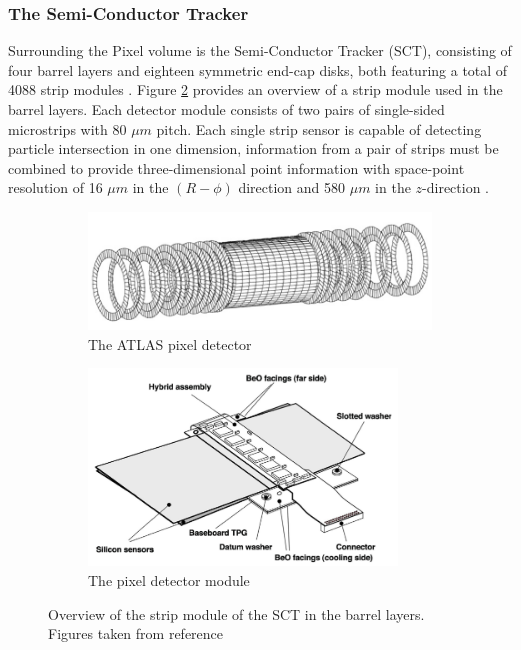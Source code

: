 \subsubsection{The Semi-Conductor Tracker}

Surrounding the Pixel volume is the Semi-Conductor Tracker (SCT), consisting of four barrel layers and eighteen symmetric end-cap disks, both featuring a total of 4088 strip modules \cite{ATLAS-TDR-04, ATLAS-TDR-05}. 
Figure \ref{subfig:strip-module} provides an overview of a strip module used in the barrel layers. 
Each detector module consists of two pairs of single-sided microstrips with $80$ $\mu m$ pitch. 
Each single strip sensor is capable of detecting particle intersection in one dimension, information from a pair of strips must be combined to provide three-dimensional point information with space-point resolution of 16 $\mu m$ in the $(R-\phi)$ direction and 580 $\mu m$ in the $z$-direction \cite{BARONE201357}. 

\begin{figure}[h!]
     \centering
     \begin{subfigure}{0.7\textwidth}
         \centering
         \includegraphics[width=\textwidth]{figures/sct-detector.png}
         \caption{The ATLAS pixel detector}
         \label{subfig:sct-detector}
     \end{subfigure}
     \begin{subfigure}{0.65\textwidth}
         \centering
         \includegraphics[width=0.9\textwidth]{figures/strip-module.png}
         \caption{The pixel detector module}
         \label{subfig:strip-module}
     \end{subfigure}
    \caption{Overview of the strip module of the SCT in the barrel layers. Figures taken from reference~\cite{Robinson_2013}}
    \label{fig:sct-detector}
\end{figure}

